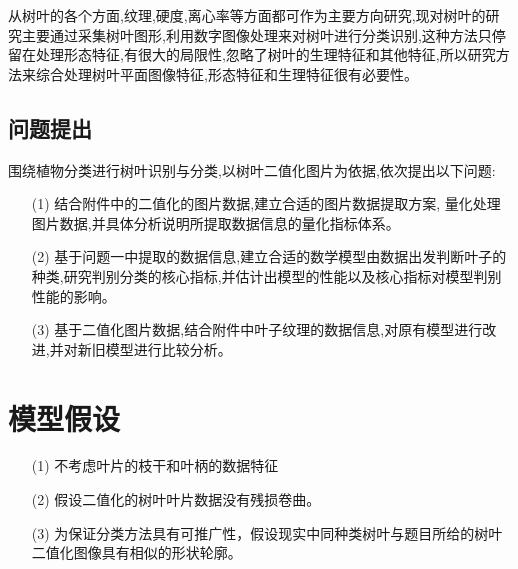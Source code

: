 \documentclass{whutmod}
\begin{document}
    从树叶的各个方面,纹理,硬度,离心率等方面都可作为主要方向研究,现对树叶的研究主要通过采集树叶图形,利用数字图像处理来对树叶进行分类识别,这种方法只停留在处理形态特征,有很大的局限性,忽略了树叶的生理特征和其他特征,所以研究方法来综合处理树叶平面图像特征,形态特征和生理特征很有必要性。
    
    

	\subsection{问题提出}
    围绕植物分类进行树叶识别与分类,以树叶二值化图片为依据,依次提出以下问题:
		 
	\begin{itemize}
	\item [(1)] 结合附件中的二值化的图片数据,建立合适的图片数据提取方案, 量化处理图片数据,并具体分析说明所提取数据信息的量化指标体系。
	\item [(2)] 基于问题一中提取的数据信息,建立合适的数学模型由数据出发判断叶子的种类,研究判别分类的核心指标,并估计出模型的性能以及核心指标对模型判别性能的影响。
	\item [(3)] 基于二值化图片数据,结合附件中叶子纹理的数据信息,对原有模型进行改进,并对新旧模型进行比较分析。
	\end{itemize}
	
	\section{模型假设}
	\begin{itemize}                                             
		\item [(1)] 不考虑叶片的枝干和叶柄的数据特征
		\item [(2)] 假设二值化的树叶叶片数据没有残损卷曲。
		\item [(3)] 为保证分类方法具有可推广性，假设现实中同种类树叶与题目所给的树叶二值化图像具有相似的形状轮廓。
	\end{itemize}
	
	
\end{document}
